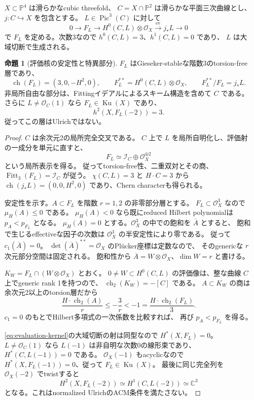 \documentclass[a4paper,11pt]{ltjsarticle}
\theoremstyle{definition}
\newtheorem{theorem}{命題}[section]
\newcommand{\CC}{\mathbb C}
\newcommand{\OO}{\mathcal O}
\newcommand{\PP}{\mathbb P}
\newcommand{\Ku}{\operatorname{Ku}}
\newcommand{\Pic}{\operatorname{Pic}}
\begin{document}
$X\subset\PP^4$ は滑らかなcubic threefold、
$C=X\cap\PP^2$ は滑らかな平面三次曲線とし、$j:C\hookrightarrow X$ を包含とする。
$L\in\Pic^3(C)$ に対して
\begin{equation}\label{eq:evaluation-kernel}
 0\longrightarrow F_L\longrightarrow H^0(C,L)\otimes\OO_X
 \xrightarrow{\mathrm{ev}}j_*L\longrightarrow0
\end{equation}
で $F_L$ を定める。次数3なので $h^0(C,L)=3$、$h^1(C,L)=0$ であり、
$L$ は大域切断で生成される。

\begin{theorem}[評価核の安定性と特異部分]\label{thm:evaluation-sheaf}
$F_L$ はGieseker-stableな階数3のtorsion-free層であり、
\[
 \operatorname{ch}(F_L)=(3,0,-H^2,0),\qquad
 F_L^{**}=H^0(C,L)\otimes\OO_X,\qquad F_L^{**}/F_L=j_*L.
\]
非局所自由な部分は、Fittingイデアルによるスキーム構造を含めて $C$ である。
さらに $L\ne\OO_C(1)$ なら $F_L\in\Ku(X)$ であり、
\[
 h^2(X,F_L(-2))=3.
\]
従ってこの層はUlrichではない。
\end{theorem}

\begin{proof}
$C$ は余次元2の局所完全交叉である。
$C$ 上で $L$ を局所自明化し、評価射の一成分を単元に直すと、
\[
 F_L\simeq\mathcal I_C\oplus\OO_X^{\oplus2}
\]
という局所表示を得る。
従ってtorsion-free性、二重双対とその商、
$\operatorname{Fitt}_3(F_L)=\mathcal I_C$ が従う。
$\chi(C,L)=3$ と $H\cdot C=3$ から
$\operatorname{ch}(j_*L)=(0,0,H^2,0)$ であり、Chern characterも得られる。

安定性を示す。$A\subset F_L$ を階数 $r=1,2$ の非零部分層とする。
$F_L\subset\OO_X^3$ なので $\mu_H(A)\le0$ である。
$\mu_H(A)<0$ なら既にreduced Hilbert polynomialは $p_A<p_{F_L}$ となる。
$\mu_H(A)=0$ とする。$\OO_X^3$ の中での飽和を $\overline A$ とすると、
飽和で生じるeffectiveな因子の次数は $\OO_X^3$ の半安定性により零である。
従って $c_1(\overline A)=0$。
$\det(\overline A)^{**}=\OO_X$ のPl\"ucker座標は定数なので、
そのgenericな $r$ 次元部分空間は固定される。
飽和性から $\overline A=W\otimes\OO_X$、$\dim W=r$ と書ける。

$K_W=F_L\cap(W\otimes\OO_X)$ とおく。
$0\ne W\subset H^0(C,L)$ の評価像は、整な曲線 $C$ 上でgeneric rank 1を持つので、
$\operatorname{ch}_2(K_W)=-[C]$ である。
$A\subset K_W$ の商は余次元2以上のtorsion層だから
\[
 \frac{H\cdot\operatorname{ch}_2(A)}r
 \le-\frac3r<-1
 =\frac{H\cdot\operatorname{ch}_2(F_L)}3.
\]
$c_1=0$ のもとでHilbert多項式の一次係数を比較すれば、
再び $p_A<p_{F_L}$ を得る。

\eqref{eq:evaluation-kernel}の大域切断の射は同型なので $H^*(X,F_L)=0$。
$L\ne\OO_C(1)$ なら $L(-1)$ は非自明な次数0の線形束であり、
$H^*(C,L(-1))=0$ である。
$\OO_X(-1)$ もacyclicなので $H^*(X,F_L(-1))=0$、従って $F_L\in\Ku(X)$。
最後に同じ完全列を $\OO_X(-2)$ でtwistすると
\[
 H^2(X,F_L(-2))\simeq H^1(C,L(-2))\simeq\CC^3
\]
となる。これはnormalized UlrichのACM条件\cite[Section 6]{FP}を満たさない。
\end{proof}
\end{document}
